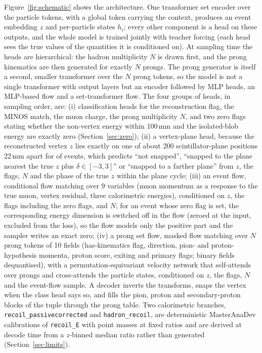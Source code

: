 \documentclass[11pt]{article}
\begin{document}
Figure~\ref{fig:schematic} shows the architecture. One transformer set encoder over the particle tokens, with a
global token carrying the context, produces an event embedding $z$ and per-particle states $h_i$; every other
component is a head on these outputs, and the whole model is trained jointly with teacher forcing (each head
sees the true values of the quantities it is conditioned on). At sampling time the heads are hierarchical: the
hadron multiplicity $N$ is drawn first, and the prong kinematics are then generated for exactly $N$ prongs. The
prong generator is itself a second, smaller transformer over the $N$ prong tokens, so the model is not a single
transformer with output layers but an encoder followed by MLP heads, an MLP-based flow and a set-transformer
flow. The four groups of heads, in sampling order, are: (i) classification heads for the reconstruction flag, the MINOS match,
the muon charge, the prong multiplicity $N$, and two zero flags stating whether the non-vertex energy within
100\,mm and the isolated-blob energy are exactly zero (Section~\ref{sec:zero}); (ii) a vertex-plane head, because the reconstructed vertex $z$
lies exactly on one of about 200 scintillator-plane positions 22\,mm apart for \nSnapReal{} of events, which predicts
``not snapped'', ``snapped to the plane nearest the true $z$ plus $\delta\in[-3,3]$'' or ``snapped to a farther
plane'' from $z$, the flags, $N$ and the phase of the true $z$ within the plane cycle; (iii) an event flow,
conditional flow matching over 9 variables (muon momentum as a response to the true muon, vertex residual, three
calorimetric energies), conditioned on $z$, the flags including the zero flags, and $N$; for an event whose zero
flag is set, the corresponding energy dimension is switched off in the flow (zeroed at the input, excluded from
the loss), so the flow models only the positive part and the sampler writes an exact zero; (iv) a prong set
flow, masked flow matching over $N$ prong tokens of 10 fields (has-kinematics flag, direction, pion- and
proton-hypothesis momenta, proton score, exiting and primary flags; binary fields dequantised), with a
permutation-equivariant velocity network that self-attends over prongs and cross-attends the particle states,
conditioned on $z$, the flags, $N$ and the event-flow sample. A decoder inverts the transforms, snaps the vertex
when the class head says so, and fills the pion, proton and secondary-proton blocks of the tuple through the
prong table. Two calorimetric branches, \texttt{recoil\_passivecorrected} and \texttt{hadron\_recoil}, are
deterministic MasterAnaDev calibrations of \texttt{recoil\_E} with point masses at fixed ratios and are
derived at decode time from a $z$-binned median ratio rather than generated (Section~\ref{sec:limits}).
\end{document}

